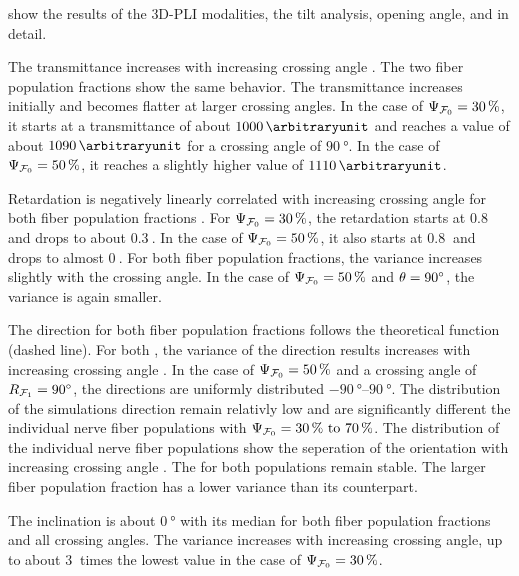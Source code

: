 % 
 show the results of the \ac{3D-PLI} modalities, the tilt analysis, opening angle, \accvalue{} and \rvalue{} in detail.
\par
The transmittance increases with increasing crossing angle \modelOmega{}.
The two fiber population fractions \modelPsi{} show the same behavior.
The transmittance increases initially and becomes flatter at larger crossing angles.
In the case of $\textnormal{$\Psi_{\textnormal{$\mathcal{F}_0$}}$} = \SI{30}{\percent}$, it starts at a transmittance of about $\SI{1000}{\arbitraryunit}$ and reaches a value of about $\SI{1090}{\arbitraryunit}$ for a crossing angle of $\SI{90}{\degree}$.
In the case of $\textnormal{$\Psi_{\textnormal{$\mathcal{F}_0$}}$} = \SI{50}{\percent}$, it reaches a slightly higher value of $\SI{1110}{\arbitraryunit}$.
\par
Retardation is negatively linearly correlated with increasing crossing angle for both fiber population fractions \modelPsi{}.
For $\textnormal{$\Psi_{\textnormal{$\mathcal{F}_0$}}$}=\SI{30}{\percent}$, the retardation starts at $\SI{0.8}{}$ and drops to about $\SI{0.3}{}$.
In the case of $\textnormal{$\Psi_{\textnormal{$\mathcal{F}_0$}}$}=\SI{50}{\percent}$, it also starts at $\SI{0.8}{}$ and drops to almost $\SI{0}{}$.
For both fiber population fractions, the variance increases slightly with the crossing angle.
In the case of $\textnormal{$\Psi_{\textnormal{$\mathcal{F}_0$}}$}=\SI{50}{\percent}$ and $\textnormal{$\theta$}=\SI{90}{\degree}$, the variance is again smaller.
\par
The direction for both fiber population fractions \modelPsi{} follows the theoretical  function (dashed line).
For both \modelPsi{}, the variance of the direction results increases with increasing crossing angle \modelOmega{}.
In the case of $\textnormal{$\Psi_{\textnormal{$\mathcal{F}_0$}}$}=\SI{50}{\percent}$ and a crossing angle of $\textnormal{$R_{\textnormal{$\mathcal{F}_1$}}$} = \SI{90}{\degree}$, the directions are uniformly distributed $\SIrange{-90}{90}{\degree}$.
The distribution of the simulations direction remain relativly low and are significantly different the individual nerve fiber populations with $\modelPsi = \SIrange{30}{70}{\percent}$.
The distribution of the individual nerve fiber populations show the seperation of the orientation with increasing crossing angle \modelOmega{}.
The \bvariance{} for both populations remain stable.
The larger fiber population fraction has a lower variance than its counterpart.
\par
The inclination is about $\SI{0}{\degree}$ with its median for both fiber population fractions and all crossing angles.
The variance increases with increasing crossing angle, up to about $\SI{3}{}$ times the lowest value in the case of $\textnormal{$\Psi_{\textnormal{$\mathcal{F}_0$}}$} = \SI{30}{\percent}$.

